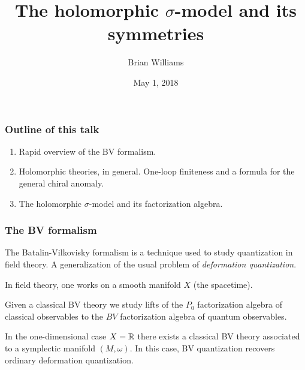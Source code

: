 \documentclass[10pt]{beamer}
\title{The holomorphic $\sigma$-model and its symmetries}
\author{Brian Williams}
\institute{Northwestern University}
\date{May 1, 2018}
\begin{document}
\frame{\titlepage}

\begin{frame}
\frametitle{Outline of this talk}
\begin{enumerate}
\item Rapid overview of the BV formalism.
\item Holomorphic theories, in general. 
One-loop finiteness and a formula for the general chiral anomaly. 
\item The holomorphic $\sigma$-model and its factorization algebra.
\end{enumerate}
\end{frame}

\begin{frame}[fragile]
\frametitle{The BV formalism}
The Batalin-Vilkovisky formalism is a technique used to study quantization in field theory.
A generalization of the usual problem of {\em deformation quantization}.
\ben
{}
\een

In field theory, one works on a smooth manifold $X$ (the spacetime). 
\ben
{}
\een
Given a classical BV theory we study lifts of the $P_0$ factorization algebra of classical observables to the $BV$ factorization algebra of quantum observables.

In the one-dimensional case $X = \mathbb R$ there exists a classical BV theory associated to a symplectic manifold $(M, \omega)$. 
In this case, BV quantization recovers ordinary deformation quantization. 
\end{frame}
\end{document}
